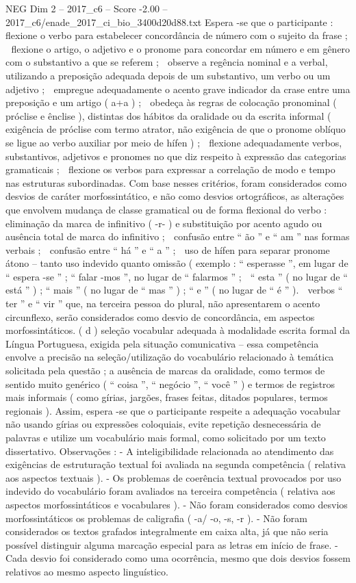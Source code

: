 \begin{textsample}{NEG Dim 2 – 2017\_c6 – Score -2.00 – 2017\_c6/enade\_2017\_ci\_bio\_3400d20d88.txt}
Espera -se que o participante :  flexione o verbo para estabelecer concordância de número com o sujeito da frase ;  flexione o artigo, o adjetivo e o pronome para concordar em número e em gênero com o substantivo a que se referem ;  observe a regência nominal e a verbal, utilizando a preposição adequada depois de um substantivo, um verbo ou um adjetivo ;  empregue adequadamente o acento grave indicador da crase entre uma preposição e um artigo ( a+a ) ;  obedeça às regras de colocação pronominal ( próclise e ênclise ), distintas dos hábitos da oralidade ou da escrita informal ( exigência de próclise com termo atrator, não exigência de que o pronome oblíquo se ligue ao verbo auxiliar por meio de hífen ) ;  flexione adequadamente verbos, substantivos, adjetivos e pronomes no que diz respeito à expressão das categorias gramaticais ;  flexione os verbos para expressar a correlação de modo e tempo nas estruturas subordinadas.
Com base nesses critérios, foram considerados como desvios de caráter morfossintático, e não como desvios ortográficos, as alterações que envolvem mudança de classe gramatical ou de forma flexional do verbo :  eliminação da marca de infinitivo ( -r- ) e substituição por acento agudo ou ausência total de marca do infinitivo ;  confusão entre “ ão ” e “ am ” nas formas verbais ;  confusão entre “ há ” e “ a ” ;  uso de hífen para separar pronome átono – tanto uso indevido quanto omissão ( exemplo : “ esperasse ”, em lugar de “ espera -se ” ; “ falar -mos ”, no lugar de “ falarmos ” ;  “ esta ” ( no lugar de “ está ” ) ; “ mais ” ( no lugar de “ mas ” ) ; “ e ” ( no lugar de “ é ” ).  verbos “ ter ” e “ vir ” que, na terceira pessoa do plural, não apresentarem o acento circunflexo, serão considerados como desvio de concordância, em aspectos morfossintáticos. ( d ) seleção vocabular adequada à modalidade escrita formal da Língua Portuguesa, exigida pela situação comunicativa – essa competência envolve a precisão na seleção/utilização do vocabulário relacionado à temática solicitada pela questão ; a ausência de marcas da oralidade, como termos de sentido muito genérico ( “ coisa ”, “ negócio ”, “ você ” ) e termos de registros mais informais ( como gírias, jargões, frases feitas, ditados populares, termos regionais ).
Assim, espera -se que o participante respeite a adequação vocabular não usando gírias ou expressões coloquiais, evite repetição desnecessária de palavras e utilize um vocabulário mais formal, como solicitado por um texto dissertativo.
Observações : - A inteligibilidade relacionada ao atendimento das exigências de estruturação textual foi avaliada na segunda competência ( relativa aos aspectos textuais ). - Os problemas de coerência textual provocados por uso indevido do vocabulário foram avaliados na terceira competência ( relativa aos aspectos morfossintáticos e vocabulares ). - Não foram considerados como desvios morfossintáticos os problemas de caligrafia ( -a/ -o, -s, -r ). - Não foram considerados os textos grafados integralmente em caixa alta, já que não seria possível distinguir alguma marcação especial para as letras em início de frase. - Cada desvio foi considerado como uma ocorrência, mesmo que dois desvios fossem relativos ao mesmo aspecto linguístico.

\end{textsample}
